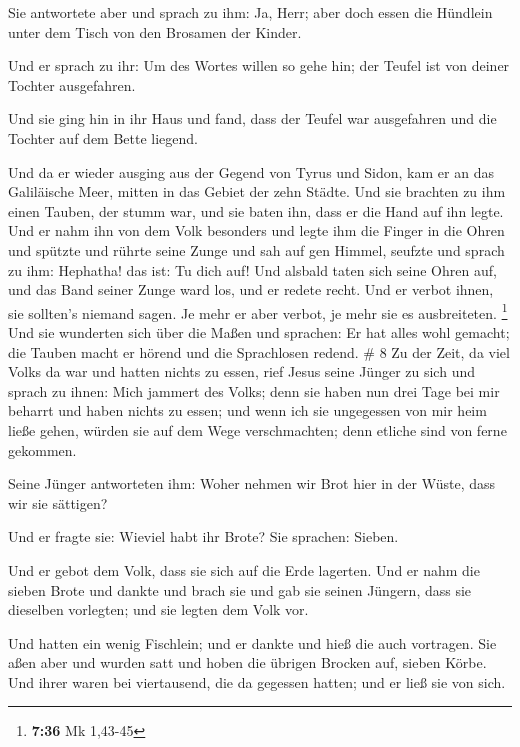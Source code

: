  Sie antwortete aber und sprach zu ihm: Ja, Herr; aber
doch essen die Hündlein unter dem Tisch von den Brosamen der Kinder.

 Und er sprach zu ihr: Um des Wortes willen so gehe hin;
der Teufel ist von deiner Tochter ausgefahren.

 Und sie ging hin in ihr Haus und fand, dass der Teufel
war ausgefahren und die Tochter auf dem Bette liegend.

 Und da er wieder ausging aus der Gegend von Tyrus und
Sidon, kam er an das Galiläische Meer, mitten in das Gebiet der zehn
Städte.  Und sie brachten zu ihm einen Tauben, der stumm
war, und sie baten ihn, dass er die Hand auf ihn legte. 
Und er nahm ihn von dem Volk besonders und legte ihm die Finger in die
Ohren und spützte und rührte seine Zunge  und sah auf gen
Himmel, seufzte und sprach zu ihm: Hephatha! das ist: Tu dich auf!
 Und alsbald taten sich seine Ohren auf, und das Band
seiner Zunge ward los, und er redete recht.  Und er
verbot ihnen, sie sollten's niemand sagen. Je mehr er aber verbot, je
mehr sie es ausbreiteten. \footnote{\textbf{7:36} Mk 1,43-45}
 Und sie wunderten sich über die Maßen und sprachen: Er
hat alles wohl gemacht; die Tauben macht er hörend und die Sprachlosen
redend. \# 8  Zu der Zeit, da viel Volks da war und hatten
nichts zu essen, rief Jesus seine Jünger zu sich und sprach zu ihnen:
 Mich jammert des Volks; denn sie haben nun drei Tage bei
mir beharrt und haben nichts zu essen;  und wenn ich sie
ungegessen von mir heim ließe gehen, würden sie auf dem Wege
verschmachten; denn etliche sind von ferne gekommen.

 Seine Jünger antworteten ihm: Woher nehmen wir Brot hier
in der Wüste, dass wir sie sättigen?

 Und er fragte sie: Wieviel habt ihr Brote? Sie sprachen:
Sieben.

 Und er gebot dem Volk, dass sie sich auf die Erde
lagerten. Und er nahm die sieben Brote und dankte und brach sie und gab
sie seinen Jüngern, dass sie dieselben vorlegten; und sie legten dem
Volk vor.

 Und hatten ein wenig Fischlein; und er dankte und hieß
die auch vortragen.  Sie aßen aber und wurden satt und
hoben die übrigen Brocken auf, sieben Körbe.  Und ihrer
waren bei viertausend, die da gegessen hatten; und er ließ sie von sich.

